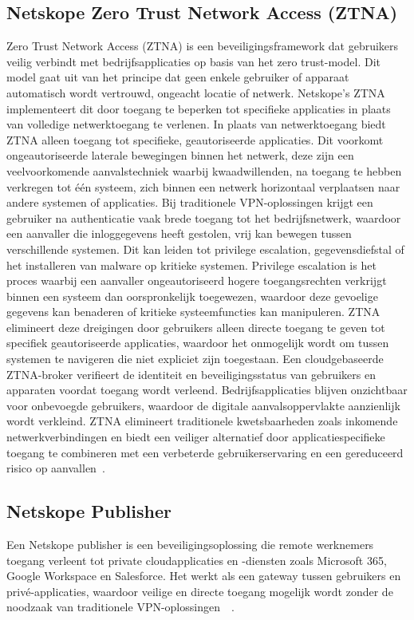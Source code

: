 \subsection{Netskope Zero Trust Network Access (ZTNA)}
Zero Trust Network Access (ZTNA) is een beveiligingsframework dat gebruikers veilig verbindt met bedrijfsapplicaties op basis van het zero trust-model. Dit model gaat uit van het principe dat geen enkele gebruiker of apparaat automatisch wordt vertrouwd, ongeacht locatie of netwerk. Netskope’s ZTNA implementeert dit door toegang te beperken tot specifieke applicaties in plaats van volledige netwerktoegang te verlenen. In plaats van netwerktoegang biedt ZTNA alleen toegang tot specifieke, geautoriseerde applicaties. Dit voorkomt ongeautoriseerde laterale bewegingen binnen het netwerk, deze zijn een veelvoorkomende aanvalstechniek waarbij kwaadwillenden, na toegang te hebben verkregen tot één systeem, zich binnen een netwerk horizontaal verplaatsen naar andere systemen of applicaties. Bij traditionele VPN-oplossingen krijgt een gebruiker na authenticatie vaak brede toegang tot het bedrijfsnetwerk, waardoor een aanvaller die inloggegevens heeft gestolen, vrij kan bewegen tussen verschillende systemen. Dit kan leiden tot privilege escalation, gegevensdiefstal of het installeren van malware op kritieke systemen. Privilege escalation is het proces waarbij een aanvaller ongeautoriseerd hogere toegangsrechten verkrijgt binnen een systeem dan oorspronkelijk toegewezen, waardoor deze gevoelige gegevens kan benaderen of kritieke systeemfuncties kan manipuleren. ZTNA elimineert deze dreigingen door gebruikers alleen directe toegang te geven tot specifiek geautoriseerde applicaties, waardoor het onmogelijk wordt om tussen systemen te navigeren die niet expliciet zijn toegestaan. Een cloudgebaseerde ZTNA-broker verifieert de identiteit en beveiligingsstatus van gebruikers en apparaten voordat toegang wordt verleend. Bedrijfsapplicaties blijven onzichtbaar voor onbevoegde gebruikers, waardoor de digitale aanvalsoppervlakte aanzienlijk wordt verkleind. ZTNA elimineert traditionele kwetsbaarheden zoals inkomende netwerkverbindingen en biedt een veiliger alternatief door applicatiespecifieke toegang te combineren met een verbeterde gebruikerservaring en een gereduceerd risico op aanvallen~\autocite{Netskope2025-5}.

\subsection{Netskope Publisher}
Een Netskope publisher is een beveiligingsoplossing die remote werknemers toegang verleent tot private cloudapplicaties en -diensten zoals Microsoft 365, Google Workspace en Salesforce. Het werkt als een gateway tussen gebruikers en privé-applicaties, waardoor veilige en directe toegang mogelijk wordt zonder de noodzaak van traditionele VPN-oplossingen~\autocite{Netskope2025-6}~\autocite{Netskope2025-7}.

